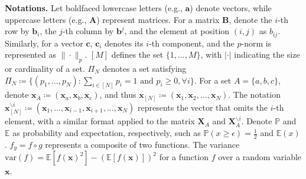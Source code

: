 \documentclass{article}
\def\va{{\mathbf{a}}}
\def\va{{\mathbf{a}}}
\def\vb{{\mathbf{b}}}
\def\vc{{\mathbf{c}}}
\def\vx{{\mathbf{x}}}
\def\mA{{\mathbf{A}}}
\def\mB{{\mathbf{B}}}
\def\mX{{\mathbf{X}}}
\def\eE{\mathbb{E}}
\def\pP{\mathbb{P}}
\begin{document}
\noindent \textbf{Notations.} Let boldfaced lowercase letters (e.g., $\va$) denote vectors, while uppercase letters (e.g., $\mA$) represent matrices. For a matrix $\mB$, denote the $i$-th row by $\vb_i$, the $j$-th column by $\vb^j$, and the element at position $(i,j)$ as $b_{ij}$. Similarly, for a vector $\vc$, $\vc_i$ denotes its $i$-th component, and the $p$-norm is represented as $\|\cdot\|_p$. $[M]$ defines the set $\{1,\dots,M\}$, with $|\cdot|$ indicating the size or cardinality of a set. 
$\Pi_N$ denotes a set satisfying $\Pi_N \coloneq \{(p_1, \dots, p_N): \sum_{i \in [N]} p_i = 1 \text{~and~} p_i \geq 0, \forall i\}$. 
For a set $A = \{a,b,c\}$, denote $\vx_A \coloneq (\vx_a,\vx_b,\vx_c)$, and thus $\vx_{[N]} \coloneq (\vx_1,\vx_2,\dots,\vx_N)$. 
The notation $\vx^{\backslash{i}}_{[N]} \coloneq (\vx_1,\dots,\vx_{i-1},\vx_{i+1},\dots,\vx_N)$ represents the vector that omits the $i$-th element, with a similar format applied to the matrix $\mX_A$ and $\mX^{\backslash{i}}_{A}$. 
Denote $\pP$ and $\eE$ as probability and expectation, respectively, such as $\pP(x \geq \epsilon) = \frac{1}{2}$ and $\eE(x)$. 
$f_g = f \circ g$ represents a composite of two functions. The variance $\mathrm{var}(f) = \eE [f(\vx)^2] - (\eE [f(\vx)])^2$ for a function $f$ over a random variable $\vx$.  
\end{document}
